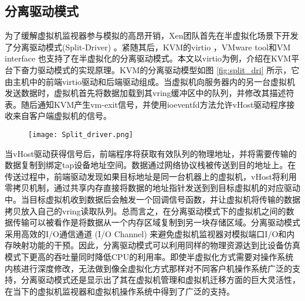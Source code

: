 \subsection{分离驱动模式}
为了缓解虚拟机监视器参与模拟的高昂开销，Xen团队首先在半虚拟化场景下开发了分离驱动模式(Split-Driver) \cite{barham2003xen} 。紧随其后，KVM的virtio \cite{russell2008virtio,kivity2007kvm} ，VMware tool和VM interface \cite{amsden2006vmi} 也支持了在半虚拟化的分离驱动模式。本文以virtio为例，介绍在KVM平台下奋力驱动模式的实现原理。KVM的分离驱动模型如图 \ref{fig:split_dri} 所示，它由主机中的前端virtio驱动和后端驱动组成。当虚拟机向服务器内的另一台虚拟机发送数据时，虚拟机首先将数据加载到其vring缓冲区中的队列，并修改其描述符表。随后通知KVM产生vm-exit信号，并使用ioeventfd方法允许vHost驱动程序接收来自客户端虚拟机的信号。
\begin{figure}[!htp]
	\centering
	\texttt{[image: Split\_driver.png]}
\end{figure}
当vHost驱动获得信号后，前端程序将获取有效队列的物理地址，并将需要传输的数据复制到绑定tap设备地址空间。数据通过网络协议栈被传送到目的地址上。在传送过程中，前端驱动发现如果目标地址是同一台机器上的虚拟机，vHost将利用零拷贝机制，通过共享内存直接将数据的地址指针发送到到目标虚拟机的对应驱动中。当目标虚拟机收到数据后会触发一个回调信号函数，并让虚拟机将传输的数据拷贝放入自己的vring读取队列。总而言之，在分离驱动模式下的虚拟机之间的数据传输可以被看作是将数据从一个内存区域复制到另一块存储区域。分离驱动模式采用高效的I/O通信通道 (I/O Channel) 来避免虚拟机监视器对模拟端口I/O和内存映射功能的干预。因此，分离驱动模式可以利用同样的物理资源达到比设备仿真模式下更高的吞吐量同时降低CPU的利用率。即使半虚拟化方式需要对操作系统内核进行深度修改，无法做到像全虚拟化方式那样对不同客户机操作系统广泛的支持，分离驱动模式还是显示出了其在虚拟机管理和虚拟机迁移方面的巨大灵活性，在当下的虚拟机监视器和虚拟机操作系统中得到了广泛的支持。


